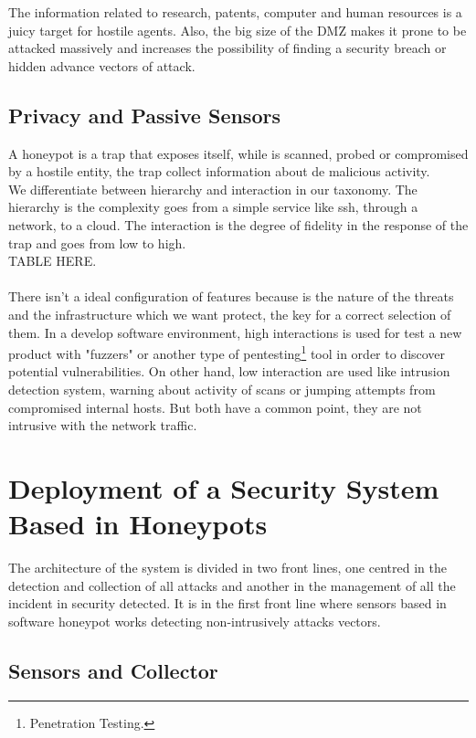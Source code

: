 \documentclass[a4paper]{llncs}
\begin{document}
The information related to research, patents,
computer and human resources is a juicy target for hostile agents. %
Also, the big size of the DMZ %
 makes it prone to be attacked massively and increases the possibility of finding a security breach or hidden advance vectors of attack.

\subsection{Privacy and Passive Sensors}
\label{sect:Privacy and Passive Sensors}
A honeypot is a trap that exposes itself, while is scanned, probed or compromised by a hostile entity, the trap collect information about de malicious activity.
\\We differentiate between hierarchy and interaction in our taxonomy. The hierarchy is the complexity goes from a simple service like ssh, through a network, to a cloud. The interaction is the degree of fidelity in the response of the trap and goes from low to high.\\TABLE HERE.\\\\There isn't a ideal configuration of features because is the nature of the threats and the infrastructure which we want protect, the key for a correct selection of them. In a develop software environment, high interactions is used for test a new product with "fuzzers" or another type of pentesting\footnote{Penetration Testing.} tool in order to discover potential vulnerabilities. On other hand, low interaction are used like intrusion detection system, warning about activity of scans or jumping attempts from compromised internal hosts. But both have a common point, they are not intrusive with the network traffic.


\section{Deployment of a Security System Based in Honeypots}

The architecture of the system is divided in two front lines, one centred in the detection and collection of all attacks and another in the management of all the incident in security detected. It is in the first front line where sensors based in software honeypot works detecting non-intrusively attacks vectors. 


\subsection{Sensors and Collector}
\end{document}
